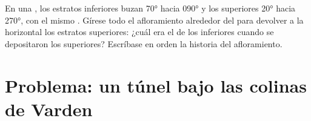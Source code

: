 \begin{exercise}[$\star\star\star$]\label{exo:b1:cross-sections:12}
En una , los estratos inferiores buzan \ang{70} hacia \ang{090} y los superiores
\ang{20} hacia \ang{270}, con el mismo . Gírese todo el afloramiento alrededor del  para
devolver a la horizontal los estratos superiores: ¿cuál era el  de los inferiores cuando se
depositaron los superiores? Escríbase en orden la historia del afloramiento.
\end{exercise}

\section{Problema: un túnel bajo las colinas de Varden}

